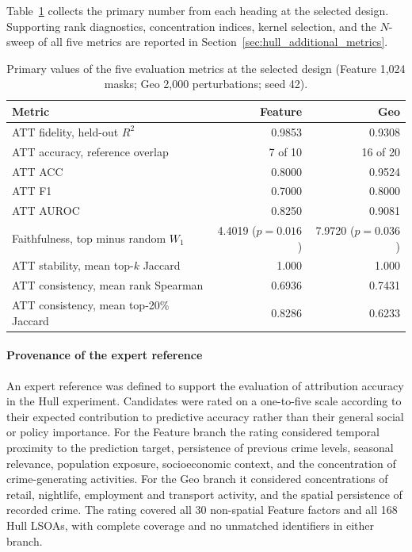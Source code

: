 Table~\ref{tab:hull_five_metrics_summary} collects the primary number from each heading at the selected design. Supporting rank diagnostics, concentration indices, kernel selection, and the $N$-sweep of all five metrics are reported in Section~\ref{sec:hull_additional_metrics}.

\begin{table}[H]
\centering
\caption{Primary values of the five evaluation metrics at the selected design (Feature 1,024 masks; Geo 2,000 perturbations; seed 42).}
\label{tab:hull_five_metrics_summary}
\small
\begin{tabularx}{\textwidth}{X r r}
\toprule
Metric & Feature & Geo \\
\midrule
ATT fidelity, held-out $R^2$ & 0.9853 & 0.9308 \\
ATT accuracy, reference overlap & 7 of 10 & 16 of 20 \\
ATT ACC & 0.8000 & 0.9524 \\
ATT F1 & 0.7000 & 0.8000 \\
ATT AUROC & 0.8250 & 0.9081 \\
Faithfulness, top minus random $W_1$ & 4.4019 ($p=0.016$) & 7.9720 ($p=0.036$) \\
ATT stability, mean top-$k$ Jaccard & 1.000 & 1.000 \\
ATT consistency, mean rank Spearman & 0.6936 & 0.7431 \\
ATT consistency, mean top-20\% Jaccard & 0.8286 & 0.6233 \\
\bottomrule
\end{tabularx}
\end{table}

\paragraph{Provenance of the expert reference}
\label{sec:hull_ground_truth}

An expert reference was defined to support the evaluation of attribution accuracy in the Hull experiment. Candidates were rated on a one-to-five scale according to their expected contribution to predictive accuracy rather than their general social or policy importance. For the Feature branch the rating considered temporal proximity to the prediction target, persistence of previous crime levels, seasonal relevance, population exposure, socioeconomic context, and the concentration of crime-generating activities. For the Geo branch it considered concentrations of retail, nightlife, employment and transport activity, and the spatial persistence of recorded crime. The rating covered all 30 non-spatial Feature factors and all 168 Hull LSOAs, with complete coverage and no unmatched identifiers in either branch.

